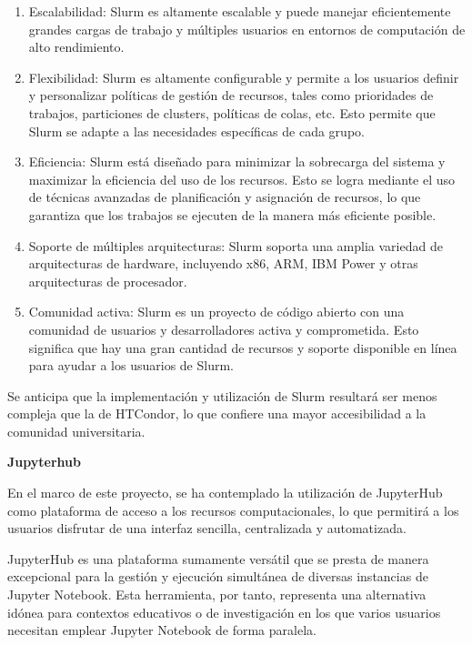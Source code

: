 \begin{spacing}{1.5}
  \begin{enumerate}
    \item Escalabilidad: Slurm es altamente escalable y puede manejar
          eficientemente grandes cargas de trabajo y múltiples usuarios en entornos de
          computación de alto rendimiento.
    \item Flexibilidad: Slurm es altamente configurable y permite a los
          usuarios definir y personalizar políticas de gestión de recursos, tales como
          prioridades de trabajos, particiones de clusters, políticas de colas, etc. Esto
          permite que Slurm se adapte a las necesidades específicas de cada grupo.
    \item Eficiencia: Slurm está diseñado para minimizar la sobrecarga del
          sistema y maximizar la eficiencia del uso de los recursos. Esto se logra
          mediante el uso de técnicas avanzadas de planificación y asignación de
          recursos, lo que garantiza que los trabajos se ejecuten de la manera más
          eficiente posible.
    \item Soporte de múltiples arquitecturas: Slurm soporta una amplia
          variedad de arquitecturas de hardware, incluyendo x86, ARM, IBM Power y otras
          arquitecturas de procesador.
    \item Comunidad activa: Slurm es un proyecto de código abierto con una
          comunidad de usuarios y desarrolladores activa y comprometida. Esto significa
          que hay una gran cantidad de recursos y soporte disponible en línea para ayudar
          a los usuarios de Slurm.
  \end{enumerate}

  Se anticipa que la implementación y utilización de Slurm resultará ser
  menos compleja que la de HTCondor, lo que confiere una mayor accesibilidad a la
  comunidad universitaria.

  \textbf{Jupyterhub}

  En el marco de este proyecto, se ha contemplado la utilización de JupyterHub como plataforma de acceso a los recursos computacionales, lo que permitirá a los usuarios disfrutar de una interfaz sencilla, centralizada y automatizada.

  JupyterHub es una plataforma sumamente versátil que se presta de manera excepcional para la gestión y ejecución simultánea de diversas instancias de Jupyter Notebook. Esta herramienta, por tanto, representa una alternativa idónea para contextos educativos o de investigación en los que varios usuarios necesitan emplear Jupyter Notebook de forma paralela.


\end{spacing}
